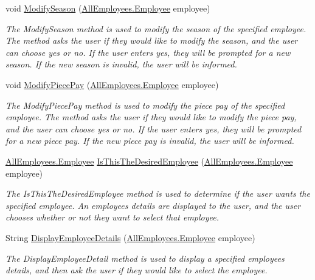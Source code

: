 \begin{DoxyCompactItemize}
void \hyperlink{class_the_company_1_1_container_af4aa83f1b02b8783ead9bae2edc771d3}{Modify\+Season} (\hyperlink{class_all_employees_1_1_employee}{All\+Employees.\+Employee} employee)
\begin{DoxyCompactList}\small\item\em The Modify\+Season method is used to modify the season of the specified employee. The method asks the user if they would like to modify the season, and the user can choose yes or no. If the user enters yes, they will be prompted for a new season. If the new season is invalid, the user will be informed. \end{DoxyCompactList}\item 
void \hyperlink{class_the_company_1_1_container_ae080e1e6827c4525fb0aee041bf5d5b3}{Modify\+Piece\+Pay} (\hyperlink{class_all_employees_1_1_employee}{All\+Employees.\+Employee} employee)
\begin{DoxyCompactList}\small\item\em The Modify\+Piece\+Pay method is used to modify the piece pay of the specified employee. The method asks the user if they would like to modify the piece pay, and the user can choose yes or no. If the user enters yes, they will be prompted for a new piece pay. If the new piece pay is invalid, the user will be informed. \end{DoxyCompactList}\item 
\hyperlink{class_all_employees_1_1_employee}{All\+Employees.\+Employee} \hyperlink{class_the_company_1_1_container_a3f8038abb67c0cec90747c0f4410a2fa}{Is\+This\+The\+Desired\+Employee} (\hyperlink{class_all_employees_1_1_employee}{All\+Employees.\+Employee} employee)
\begin{DoxyCompactList}\small\item\em The Is\+This\+The\+Desired\+Employee method is used to determine if the user wants the specified employee. An employee\textquotesingle{}s details are displayed to the user, and the user chooses whether or not they want to select that employee. \end{DoxyCompactList}\item 
String \hyperlink{class_the_company_1_1_container_a7d0ce158e13ecc9f5d1e53700d82f354}{Display\+Employee\+Details} (\hyperlink{class_all_employees_1_1_employee}{All\+Employees.\+Employee} employee)
\begin{DoxyCompactList}\small\item\em The Display\+Employee\+Detail method is used to display a specified employee\textquotesingle{}s details, and then ask the user if they would like to select the employee. \end{DoxyCompactList}\end{DoxyCompactItemize}
